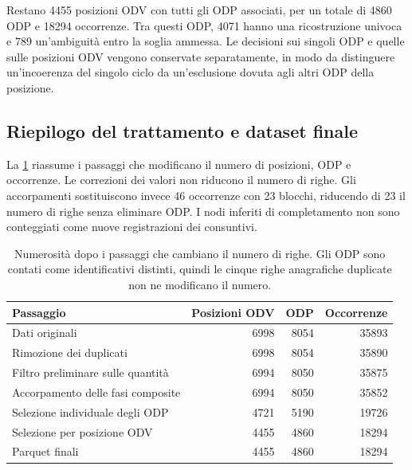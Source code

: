 Restano \num{4455} posizioni ODV con tutti gli ODP associati, per un totale di \num{4860} ODP e \num{18294} occorrenze. Tra questi ODP, \num{4071} hanno una ricostruzione univoca e 789 un'ambiguità entro la soglia ammessa. Le decisioni sui singoli ODP e quelle sulle posizioni ODV vengono conservate separatamente, in modo da distinguere un'incoerenza del singolo ciclo da un'esclusione dovuta agli altri ODP della posizione.

\subsection{Riepilogo del trattamento e dataset finale}
\label{sec:data-treatment-summary}

La \cref{tab:data-treatment-counts} riassume i passaggi che modificano il numero di posizioni, ODP e occorrenze. Le correzioni dei valori non riducono il numero di righe. Gli accorpamenti sostituiscono invece 46 occorrenze con 23 blocchi, riducendo di 23 il numero di righe senza eliminare ODP. I nodi inferiti di completamento non sono conteggiati come nuove registrazioni dei consuntivi.

\begin{table}[htbp]
\centering
\small
\begin{tabularx}{\linewidth}{@{}Xrrr@{}}
\toprule
\textbf{Passaggio} & \textbf{Posizioni ODV} & \textbf{ODP} & \textbf{Occorrenze} \\
\midrule
Dati originali & \num{6998} & \num{8054} & \num{35893} \\
Rimozione dei duplicati & \num{6998} & \num{8054} & \num{35890} \\
Filtro preliminare sulle quantità & \num{6994} & \num{8050} & \num{35875} \\
Accorpamento delle fasi composite & \num{6994} & \num{8050} & \num{35852} \\
Selezione individuale degli ODP & \num{4721} & \num{5190} & \num{19726} \\
Selezione per posizione ODV & \num{4455} & \num{4860} & \num{18294} \\
Parquet finali & \num{4455} & \num{4860} & \num{18294} \\
\bottomrule
\end{tabularx}
\caption{Numerosità dopo i passaggi che cambiano il numero di righe. Gli ODP sono contati come identificativi distinti, quindi le cinque righe anagrafiche duplicate non ne modificano il numero.}
\label{tab:data-treatment-counts}
\end{table}

